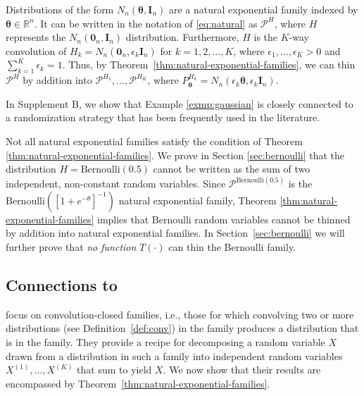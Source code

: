 \documentclass[12pt]{article}
\begin{document}
\begin{exmp} 
\label{exmp:gaussian}
Distributions of the form  $N_n(\boldsymbol\theta, \mathbf{I}_n)$ are a natural exponential family indexed by $\boldsymbol\theta\in\mathbb{R}^n$. It can be written in the notation of \eqref{eq:natural}  as 
$\mathcal{P}^{H}$, where $H$ represents the $N_n(\mathbf{0}_n, \mathbf{I}_n)$ distribution.  Furthermore, $H$ is the $K$-way convolution of $H_k = N_n(\mathbf{0}_n, \epsilon_k \mathbf{I}_n)$ for $k = 1, 2, \ldots, K$, where $\epsilon_1,\ldots,\epsilon_K>0$ and $\sum_{k=1}^K \epsilon_k=1$.  Thus, by Theorem~\ref{thm:natural-exponential-families},   we can thin  $\mathcal{P}^{H}$ by addition into $\mathcal P^{H_1}, \ldots, \mathcal P^{H_K}$, where $P_{\boldsymbol\theta}^{H_k}=N_n(\epsilon_k \boldsymbol\theta, \epsilon_k \mathbf{I}_n)$. 
\end{exmp}

In Supplement B, we show that Example \ref{exmp:gaussian} is closely connected 
to a randomization strategy that has been frequently used in the literature.

Not all natural exponential families satisfy the condition of Theorem \ref{thm:natural-exponential-families}. 
We prove in Section \ref{sec:bernoulli} that the distribution $H=\text{Bernoulli}(0.5)$ cannot be written as the sum of two independent, non-constant random variables. 
Since $\mathcal P^{\text{Bernoulli}(0.5)}$ is the $\text{Bernoulli}([1+e^{-\theta}]^{-1})$ natural exponential family, Theorem \ref{thm:natural-exponential-families} implies that Bernoulli random variables cannot be thinned by addition into natural exponential families. In Section~\ref{sec:bernoulli} we will further prove that {\em no function} $T(\cdot)$ can thin the Bernoulli family.

\subsection{Connections to \citet{neufeld2023data}}
\label{subsec:neufeld}

\cite{neufeld2023data} focus on convolution-closed families, i.e., those for which convolving two or more distributions (see Definition~\ref{def:conv}) in the family produces a distribution that is in the family. 
They provide a recipe for decomposing 
a random variable $X$ drawn from a distribution in such a family into independent random variables $X^{(1)}, \ldots, X^{(K)}$ that sum to yield $X$.  
We now show that their results are encompassed by Theorem~\ref{thm:natural-exponential-families}.
\end{document}
